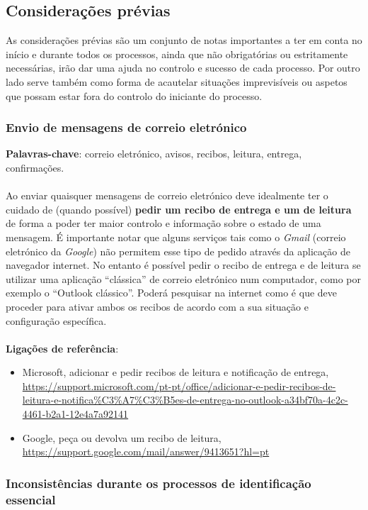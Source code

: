 \subsection{Considerações prévias}

As considerações prévias são um conjunto de notas importantes a ter em
conta no início e durante todos os processos, ainda que não obrigatórias
ou estritamente necessárias, irão dar uma ajuda no controlo e sucesso de
cada processo. Por outro lado serve também como forma de acautelar
situações imprevisíveis ou aspetos que possam estar fora do controlo do
iniciante do processo. \\

\subsubsection{Envio de mensagens de correio eletrónico}

\textbf{Palavras-chave}: correio eletrónico, avisos, recibos, leitura, entrega, confirmações. \\
\\
Ao enviar quaisquer mensagens de correio eletrónico deve idealmente ter
o cuidado de (quando possível) \textbf{pedir um recibo de entrega e um
de leitura} de forma a poder ter maior controlo e informação sobre o
estado de uma mensagem. É importante notar que alguns serviços tais como
o \emph{Gmail} (correio eletrónico da \emph{Google}) não permitem esse
tipo de pedido através da aplicação de navegador internet. No entanto é
possível pedir o recibo de entrega e de leitura se utilizar uma
aplicação ``clássica'' de correio eletrónico num computador, como por
exemplo o ``Outlook clássico''. Poderá pesquisar na internet como é que
deve proceder para ativar ambos os recibos de acordo com a sua situação
e configuração específica. \\
\\
\textbf{Ligações de referência}:
\begin{itemize}
	\item Microsoft, adicionar e pedir recibos de leitura e notificação de entrega, \url{https://support.microsoft.com/pt-pt/office/adicionar-e-pedir-recibos-de-leitura-e-notifica\%C3\%A7\%C3\%B5es-de-entrega-no-outlook-a34bf70a-4c2c-4461-b2a1-12e4a7a92141}
	\item Google, peça ou devolva um recibo de leitura, \url{https://support.google.com/mail/answer/9413651?hl=pt}
\end{itemize}

\subsubsection{Inconsistências durante os processos de identificação essencial}

